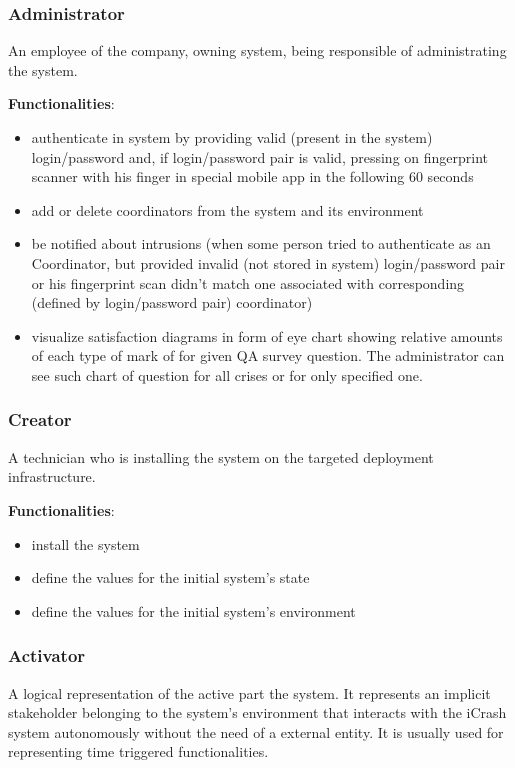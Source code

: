 \subsubsection{Administrator}
An employee of the company, owning \mysystemname system, being responsible of
administrating the system. 

\textbf{Functionalities}:

\begin{itemize}
  \item authenticate in \mysystemname system by providing valid (present in the
  system) login/password and, if login/password pair is valid, pressing on
  fingerprint scanner with his finger in special mobile app in the following 60
  seconds
  \item add or delete coordinators from the system and its environment
  \item be notified about intrusions (when some person tried to authenticate as
  an Coordinator, but provided invalid (not stored in \mysystemname system)
  login/password pair or his fingerprint scan didn't match one associated with
  corresponding (defined by login/password pair) coordinator)
  \item visualize satisfaction diagrams in form of eye chart showing relative
  amounts of each type of mark of for given QA survey question. The
  administrator can see such chart of question for all crises or for only
  specified one.
\end{itemize}

\subsubsection{Creator}
A technician who is installing the \mysystemname system on the targeted
deployment infrastructure.

\textbf{Functionalities}:

\begin{itemize}
  \item install the \mysystemname system
  \item define the values for the initial system’s state
  \item define the values for the initial system’s environment
\end{itemize}

\subsubsection{Activator}
A logical representation of the active part the \mysystemname system.
It represents an implicit stakeholder belonging to the system’s environment
that interacts with the iCrash system autonomously without the need of a
external entity. It is usually used for representing time triggered functionalities.

